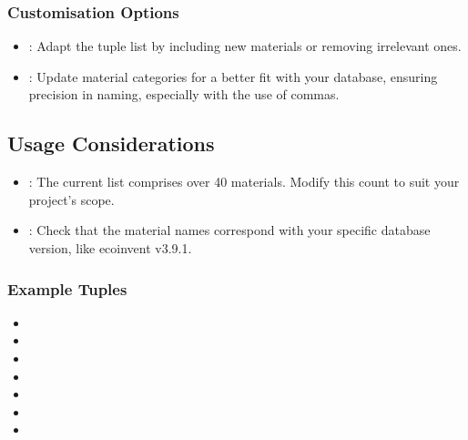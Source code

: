 \documentclass[letterpaper,10pt,english]{sphinxmanual}
\begin{document}
\subsubsection{Customisation Options}
\label{\detokenize{configuration:customisation-options}}\begin{itemize}
\item {} 
\sphinxAtStartPar
{}: Adapt the tuple list by including new materials or removing irrelevant ones.

\item {} 
\sphinxAtStartPar
{}: Update material categories for a better fit with your database, ensuring precision in naming, especially with the use of commas.

\end{itemize}


\subsection{Usage Considerations}
\label{\detokenize{configuration:usage-considerations}}\begin{itemize}
\item {} 
\sphinxAtStartPar
{}: The current list comprises over 40 materials. Modify this count to suit your project’s scope.

\item {} 
\sphinxAtStartPar
{}: Check that the material names correspond with your specific database version, like ecoinvent v3.9.1.

\end{itemize}


\subsubsection{Example Tuples}
\label{\detokenize{configuration:example-tuples}}\begin{itemize}
\item {} 
\sphinxAtStartPar
{}

\item {} 
\sphinxAtStartPar
{}

\item {} 
\sphinxAtStartPar
{}

\item {} 
\sphinxAtStartPar
{}

\item {} 
\sphinxAtStartPar
{}

\item {} 
\sphinxAtStartPar
{}

\item {} 
\sphinxAtStartPar
{}

\end{itemize}
\end{document}
